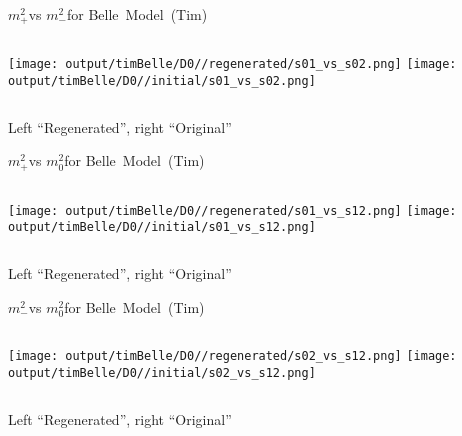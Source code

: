 \documentclass{beamer}
\newcommand{\MP}{\ensuremath{m^2_+}}
\newcommand{\MM}{\ensuremath{m^2_-}}
\newcommand{\MZ}{\ensuremath{m^2_0}}
\begin{document}
\begin{frame}{\MP vs \MM for Belle\ Model\ (Tim)}
\begin{columns}[t]
\centering
\texttt{[image: output/timBelle/D0//regenerated/s01\_vs\_s02.png]}
\centering
\texttt{[image: output/timBelle/D0//initial/s01\_vs\_s02.png]}
\end{columns}
    \centering
    Left ``Regenerated'', right ``Original''
\end{frame} 


\begin{frame}{\MP vs \MZ for Belle\ Model\ (Tim)}
\begin{columns}[t]
\centering
\texttt{[image: output/timBelle/D0//regenerated/s01\_vs\_s12.png]}
\centering
\texttt{[image: output/timBelle/D0//initial/s01\_vs\_s12.png]}
\end{columns}
    \centering
    Left ``Regenerated'', right ``Original''
\end{frame} 


\begin{frame}{\MM vs \MZ for Belle\ Model\ (Tim)}
\begin{columns}[t]
\centering
\texttt{[image: output/timBelle/D0//regenerated/s02\_vs\_s12.png]}
\centering
\texttt{[image: output/timBelle/D0//initial/s02\_vs\_s12.png]}
\end{columns}
    \centering
    Left ``Regenerated'', right ``Original''
\end{frame} 
\end{document}
